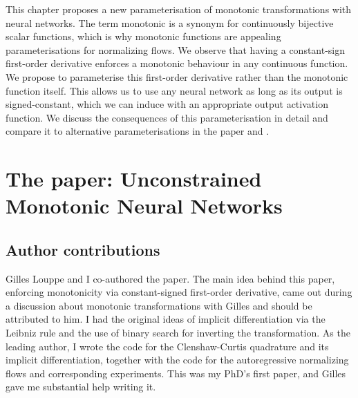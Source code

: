 This chapter proposes a new parameterisation of monotonic transformations with neural networks. The term monotonic is a synonym for continuously bijective scalar functions, which is why monotonic functions are appealing parameterisations for normalizing flows. We observe that having a constant-sign first-order derivative enforces a monotonic behaviour in any continuous function. We propose to parameterise this first-order derivative rather than the monotonic function itself. This allows us to use any neural network as long as its output is signed-constant, which we can induce with an appropriate output activation function. We discuss the consequences of this parameterisation in detail and compare it to alternative parameterisations in the paper and .

%


\section{The paper: Unconstrained Monotonic Neural Networks}
\subsection{Author contributions}
Gilles Louppe and I co-authored the paper. The main idea behind this paper, enforcing monotonicity via constant-signed first-order derivative, came out during a discussion about monotonic transformations with Gilles and should be attributed to him. I had the original ideas of implicit differentiation via the Leibniz rule and the use of binary search for inverting the transformation. As the leading author, I wrote the code for the Clenshaw-Curtis quadrature and its implicit differentiation, together with the code for the autoregressive normalizing flows and corresponding experiments. This was my PhD's first paper, and Gilles gave me substantial help writing it.

